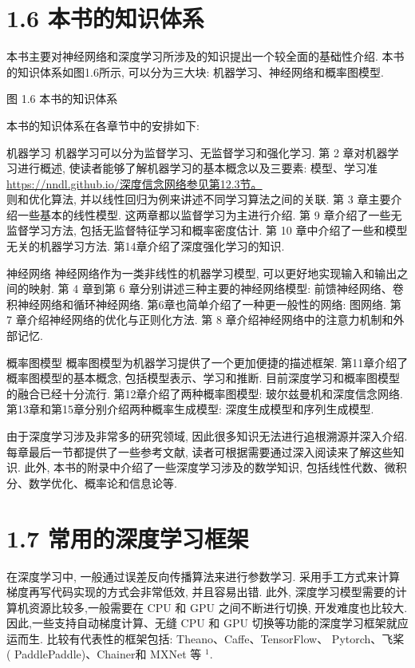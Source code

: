 \documentclass[10pt]{article}
\begin{document}
\section*{1.6 本书的知识体系}
本书主要对神经网络和深度学习所涉及的知识提出一个较全面的基础性介绍. 本书的知识体系如图1.6所示, 可以分为三大块: 机器学习、神经网络和概率图模型.



图 1.6 本书的知识体系

本书的知识体系在各章节中的安排如下:

机器学习 机器学习可以分为监督学习、无监督学习和强化学习. 第 2 章对机器学习进行概述, 使读者能够了解机器学习的基本概念以及三要素: 模型、学习准 \href{https://nndl.github.io/%E6%B7%B1%E5%BA%A6%E4%BF%A1%E5%BF%B5%E7%BD%91%E7%BB%9C%E5%8F%82%E8%A7%81%E7%AC%AC12.3%E8%8A%82%E3%80%82}{https://nndl.github.io/深度信念网络参见第12.3节。}\\
则和优化算法, 并以线性回归为例来讲述不同学习算法之间的关联. 第 3 章主要介绍一些基本的线性模型. 这两章都以监督学习为主进行介绍. 第 9 章介绍了一些无监督学习方法, 包括无监督特征学习和概率密度估计. 第 10 章中介绍了一些和模型无关的机器学习方法. 第14章介绍了深度强化学习的知识.

神经网络 神经网络作为一类非线性的机器学习模型, 可以更好地实现输入和输出之间的映射. 第 4 章到第 6 章分别讲述三种主要的神经网络模型: 前馈神经网络、卷积神经网络和循环神经网络. 第6章也简单介绍了一种更一般性的网络: 图网络. 第 7 章介绍神经网络的优化与正则化方法. 第 8 章介绍神经网络中的注意力机制和外部记忆.

概率图模型 概率图模型为机器学习提供了一个更加便捷的描述框架. 第11章介绍了概率图模型的基本概念, 包括模型表示、学习和推断. 目前深度学习和概率图模型的融合已经十分流行. 第12章介绍了两种概率图模型: 玻尔兹曼机和深度信念网络. 第13章和第15章分别介绍两种概率生成模型: 深度生成模型和序列生成模型.

由于深度学习涉及非常多的研究领域, 因此很多知识无法进行追根溯源并深入介绍. 每章最后一节都提供了一些参考文献, 读者可根据需要通过深入阅读来了解这些知识. 此外, 本书的附录中介绍了一些深度学习涉及的数学知识, 包括线性代数、微积分、数学优化、概率论和信息论等.

\section*{1.7 常用的深度学习框架}
在深度学习中, 一般通过误差反向传播算法来进行参数学习. 采用手工方式来计算梯度再写代码实现的方式会非常低效, 并且容易出错. 此外, 深度学习模型需要的计算机资源比较多,一般需要在 CPU 和 GPU 之间不断进行切换, 开发难度也比较大. 因此,一些支持自动梯度计算、无缝 CPU 和 GPU 切换等功能的深度学习框架就应运而生. 比较有代表性的框架包括: Theano、Caffe、TensorFlow、 Pytorch、飞桨 ( PaddlePaddle)、Chainer和 MXNet 等 ${ }^{1}$.
\end{document}
